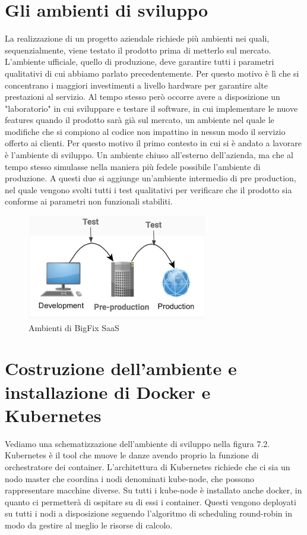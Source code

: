 \section{Gli ambienti di sviluppo }
La realizzazione di un progetto aziendale richiede più ambienti nei quali, sequenzialmente, viene testato il prodotto prima di metterlo sul mercato. L'ambiente ufficiale, quello di produzione, deve garantire tutti i parametri qualitativi di cui abbiamo parlato precedentemente. Per questo motivo è lì che si concentrano i maggiori investimenti a livello hardware per garantire alte prestazioni al servizio. Al tempo stesso però occorre avere a disposizione un "laboratorio" in cui sviluppare e testare il software, in cui implementare le nuove features quando il prodotto sarà già sul mercato, un ambiente nel quale le modifiche che si compiono al codice non impattino in nessun modo il servizio offerto ai clienti. Per questo motivo il primo contesto in cui si è andato a lavorare è l'ambiente di sviluppo. Un ambiente chiuso all'esterno dell'azienda, ma che al tempo stesso simulasse nella maniera più fedele possibile l'ambiente di produzione. A questi due si aggiunge un'ambiente intermedio di pre production, nel quale vengono svolti tutti i test qualitativi per verificare che il prodotto sia conforme ai parametri non funzionali stabiliti. 
\begin{figure}[h!]
	\centering
	\includegraphics[width=0.7\textwidth,keepaspectratio=true]{capitoli/imgs/ambientisviluppo.png}
	\caption{Ambienti di BigFix SaaS}
\end{figure}

\section{Costruzione dell'ambiente e installazione di Docker e Kubernetes}
Vediamo una schematizzazione dell'ambiente di sviluppo nella figura 7.2. Kubernetes è il tool che muove le danze avendo proprio la funzione di orchestratore dei container. L'architettura di Kubernetes richiede che ci sia un nodo master che coordina i nodi denominati kube-node, che possono rappresentare macchine diverse. Su tutti i kube-node è installato anche docker, in quanto ci permetterà di ospitare su di essi i container. Questi vengono deployati su tutti i nodi a disposizione seguendo l'algoritmo di scheduling round-robin in modo da gestire al meglio le risorse di calcolo. 
